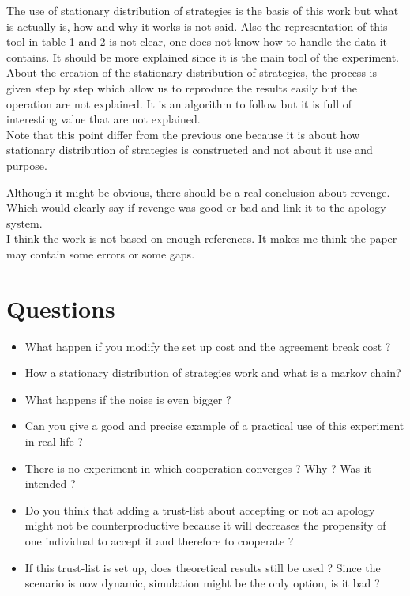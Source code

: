 \documentclass{article}
\begin{document}
The use of stationary distribution of strategies is the basis of this work but what is actually is, how and why it works is not said. Also the representation of this tool in table 1 and 2 is not clear, one does not know how to handle the data it contains. It should be more explained since it is the main tool of the experiment.\\

About the creation of the stationary distribution of strategies, the process is given step by step which allow us to reproduce the results easily but the operation are not explained. It is an algorithm to follow but it is full of interesting value that are not explained.\\
Note that this point differ from the previous one because it is about how stationary distribution of strategies is constructed and not about it use and purpose.\\ 

Although it might be obvious, there should be a real conclusion about revenge. Which would clearly say if revenge was good or bad and link it to the apology system.\\

I think the work is not based on enough references. It makes me think the paper may contain some errors or some gaps.


\section{Questions}
\begin{itemize}

\item What happen if you modify the set up cost and the agreement break cost ?

\item How a stationary distribution of strategies work and what is a markov chain?

\item What happens if the noise is even bigger ? 

\item Can you give a good and precise example of a practical use of this experiment in real life ? 

\item There is no experiment in which cooperation converges ? Why ? Was it intended ?

\item Do you think that adding a trust-list about accepting or not an apology might not be counterproductive because it will decreases the propensity of one individual to accept it and therefore to cooperate ?

\item If this trust-list is set up, does theoretical results still be used ? Since the scenario is now dynamic, simulation might be the only option, is it bad ?

\end{itemize}
\end{document}
